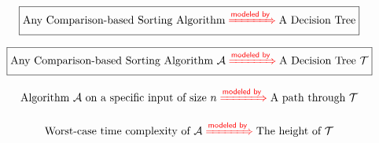 \begin{frame}{}
  \begin{center}
    {\Large {}} 
  \end{center}

  \vspace{-0.40cm}
  \[
    \boxed{\text{Any Comparison-based Sorting Algorithm} \;\textcolor{red}{\xRightarrow{ \textsf{modeled by} }}\; \text{A Decision Tree}}
  \]

\end{frame}

\begin{frame}{}
  \begin{center}
    {\Large {}} 
  \end{center}

  \vspace{-0.40cm}
  \[
    \boxed{\text{Any Comparison-based Sorting Algorithm } \mathcal{A} \;\textcolor{red}{\xRightarrow{\textsf{modeled by}}}\; \text{A Decision Tree } \mathcal{T}}
  \]

  \pause
  \[
    \text{Algorithm $\mathcal{A}$ on a specific input of size } n \;\textcolor{red}{\xRightarrow{\textsf{modeled by}}}\; \text{A path through } \mathcal{T}
  \]

  \pause
  \[
    \text{Worst-case time complexity of $\mathcal{A}$} \;\textcolor{red}{\xRightarrow{\textsf{modeled by}}}\; \text{The height of } \mathcal{T}
  \]

  \pause
  \vspace{0.50cm}
  \centering
\end{frame}

